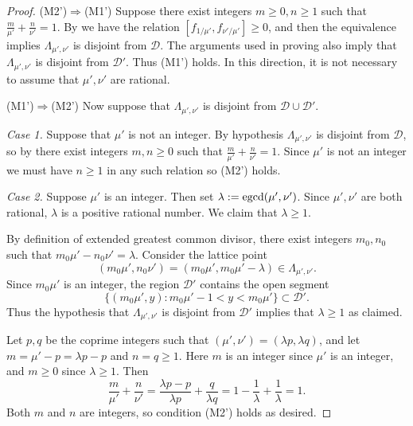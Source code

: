 \documentclass[11pt, letterpaper, reqno]{amsart}
\theoremstyle{definition}
\theoremstyle{remark}
\numberwithin{equation}{section}
\newcommand{\uu}{{\mu'}}
\newcommand{\vv}{{\nu'}}
\newcommand{\cD}{\mathcal{D}}
\newcommand{\cDprime}{{\mathcal{D}'}}
\newcommand{\egcd}{{\rm egcd}}
\begin{document}
\begin{proof}
(M2')$ \Rightarrow $(M1')
Suppose there exist integers $m\geq 0, n\geq 1$ such that $\frac{m}{\uu} + \frac{n}{\vv}=1$. 
By %
\cite[Theorem 5.4]{LagR:2018a}
we have the relation $[f_{1/\uu},f_{\vv/\uu}] \geq 0$,
and then the equivalence
 \cite[Proposition 5.2]{LagR:2018a}  
implies
$\Lambda_{\uu,\vv}$ is disjoint from $\cD$. 
The arguments used in proving \cite[Theorem 5.4 and Lemma 5.5]{LagR:2018a}
also imply that $\Lambda_{\uu,\vv}$
 is disjoint from $\cDprime$. 
Thus (M1') holds.
In this direction, it is not necessary to assume that $\uu, \vv$ are rational.


(M1')$ \Rightarrow $(M2')
Now suppose that $\Lambda_{\uu,\vv}$ is disjoint from $\cD\cup\cDprime$.

{\em Case 1.} 
Suppose that $\uu$ is not an integer. 
By hypothesis $\Lambda_{\uu,\vv}$ is disjoint from $\cD$, 
so by \cite[Proposition 5.2]{LagR:2018a}
there  exist integers $m,n\geq 0$ such that
$ \frac{m}{\uu} + \frac{n}{\vv} = 1$.
Since $\uu$ is not an integer
we must have $n\geq 1$ in any such relation so (M2') holds.

{\em Case 2.}
Suppose $\uu$ is an integer. Then set
 $\lambda := \egcd(\uu, \vv)$.
Since $\uu,\vv$ are both rational, 
$\lambda$ is a positive rational number.
We claim that $\lambda \geq 1$.

By definition of extended greatest common divisor, there exist integers $m_0, n_0$ such that
${ m_0 \uu - n_0 \vv = \lambda }$.
Consider the lattice point 
$$(m_0 \uu, n_0 \vv)  = (m_0 \uu, m_0 \uu - \lambda) \in \Lambda_{\uu,\vv} .$$
Since $m_0 \uu$ is an integer, 
the region $\cDprime$ contains the open segment
$$\{ (m_0 \uu, y) : m_0 \uu -1 < y < m_0 \uu\} \subset \cDprime.$$
Thus the hypothesis that $\Lambda_{\uu,\vv}$ is disjoint from $\cDprime$
implies that $\lambda \geq 1$ as claimed.

Let $p,q$ be the coprime integers
such that $(\uu,\vv) = (\lambda p, \lambda q)$,
and let
$m = \uu - p = \lambda p - p$ and $n = q \geq 1$.
Here $m$ is an integer since $\uu$ is an integer,
and $m\geq 0$ since $\lambda \geq 1$.
Then
\[
 \frac{m}{\uu} + \frac{n}{\vv} = \frac{\lambda p-p}{\lambda p} + \frac{q}{\lambda q} 
= 1 - \frac{1}{\lambda} + \frac{1}{\lambda}  = 1 .
\]
Both $m$ and $n$ are integers, so condition (M2') holds as desired.
\end{proof}
\end{document}
